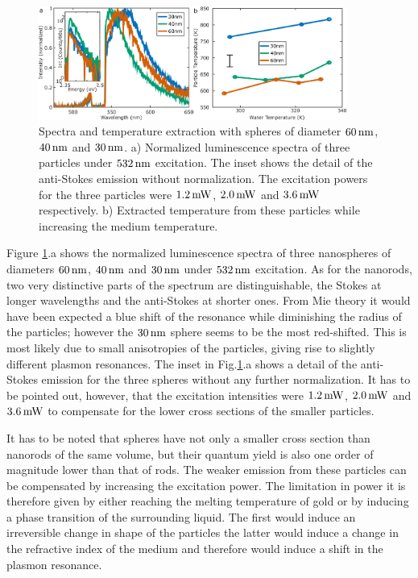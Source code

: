 \begin{figure}[htp] \centering
\includegraphics[width=0.90\textwidth]{Chapters/04_Anti-Stokes/Figures/07_Spheres/07_spheres.png}
\caption{Spectra and temperature extraction with spheres of
diameter $60\,\textrm{nm}$,$40\,\textrm{nm}$ and $30\,\textrm{nm}$. a) Normalized luminescence spectra of
three particles under $532\,\textrm{nm}$ excitation. The inset shows the detail of the
anti-Stokes emission without normalization. The excitation powers for the three
particles were $1.2\,\textrm{mW}$, $2.0\,\textrm{mW}$ and $3.6\,\textrm{mW}$ respectively. b) Extracted
temperature from these particles while increasing the medium temperature.}
	\label{fig:spheres}
\end{figure}

Figure \ref{fig:spheres}.a shows the normalized luminescence spectra of three
nanospheres of diameters $60\,\textrm{nm}$, $40\,\textrm{nm}$ and $30\,\textrm{nm}$ under $532\,\textrm{nm}$ excitation.
As for the nanorods, two very distinctive parts of the spectrum are
distinguishable, the Stokes at longer wavelengths and the anti-Stokes at shorter
ones. From Mie theory it would have been expected a blue shift of the resonance
while diminishing the radius of the particles; however the $30\,\textrm{nm}$ sphere seems
to be the most red-shifted. This is most likely due to small anisotropies of the
particles, giving rise to slightly different plasmon resonances. The inset in
Fig.\ref{fig:spheres}.a shows a detail of the anti-Stokes emission for the three
spheres without any further normalization. It has to be pointed out, however,
that the excitation intensities were $1.2\,\textrm{mW}$, $2.0\,\textrm{mW}$ and $3.6\,\textrm{mW}$ to
compensate for the lower cross sections of the smaller particles.

It has to be noted that spheres have not only a smaller cross section than
nanorods of the same volume, but their quantum yield is also one order of
magnitude lower than that of rods\cite{Yorulmaz2012}. The weaker emission from
these particles can be compensated by increasing the excitation power. The
limitation in power it is therefore given by either reaching the melting
temperature of gold or by inducing a phase transition of the surrounding liquid.
The first would induce an irreversible change in shape of the
particles\cite{Zijlstra2009a} the latter would induce a change in the refractive
index of the medium and therefore would induce a shift in the plasmon
resonance\cite{Hou2015}.

